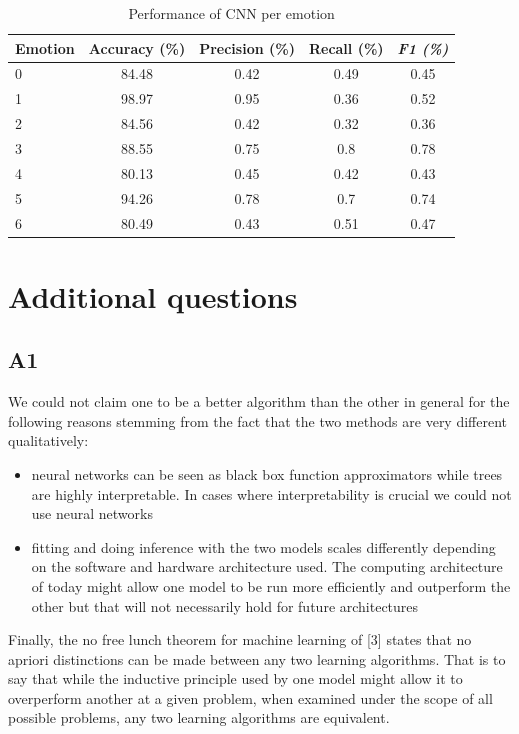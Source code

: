 \documentclass[12pt,twoside]{article}
\begin{document}
\begin{table}[!htbp]
\centering
\begin{tabular}{|l|c|c|c|c|}
\hline
\textbf{Emotion} & \multicolumn{1}{l|}{\textbf{Accuracy (\%)}} & \multicolumn{1}{l|}{\textbf{Precision (\%)}} & \multicolumn{1}{l|}{\textbf{Recall (\%)}} & \multicolumn{1}{l|}{\textit{\textbf{F1 (\%)}}} \\ \hline
0 & 84.48&  0.42&  0.49&  0.45\\ \hline
1 & 98.97&  0.95&  0.36&  0.52\\ \hline
2 & 84.56&  0.42&  0.32&  0.36\\ \hline
3 & 88.55&  0.75&  0.8 &  0.78\\ \hline
4 & 80.13&  0.45&  0.42&  0.43\\ \hline
5 & 94.26&  0.78&  0.7 &  0.74\\ \hline
6 & 80.49&  0.43&  0.51&  0.47\\ \hline
\end{tabular}
\caption{Performance of CNN per emotion}
\label{performance02}
\end{table}


\section{Additional questions}

\subsection{A1}
We could not claim one to be a better algorithm than the other in general for the following reasons stemming from the fact that the two methods are very different qualitatively:
\begin{itemize}
\item neural networks can be seen as black box function approximators while trees are highly interpretable. In cases where interpretability is crucial we could not use neural networks
\item fitting and doing inference with the two models scales differently depending on the software and hardware architecture used. The computing architecture of today might allow one model to be run more efficiently and outperform the other but that will not necessarily hold for future architectures
\end{itemize}
Finally, the no free lunch theorem for machine learning of [3] states that no apriori distinctions can be made between any two learning algorithms. That is to say that while the inductive principle used by one model might allow it to overperform another at a given problem, when examined under the scope of all possible problems, any two learning algorithms are equivalent.
\end{document}
